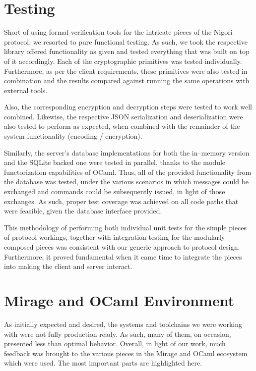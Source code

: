 \section{Testing}
Short of using formal verification tools for the intricate pieces of the Nigori protocol, we resorted to pure functional testing.
As such, we took the respective library offered functionality as given and tested everything that was built on top of it accordingly.
Each of the cryptographic primitives was tested individually.
Furthermore, as per the client requirements, these primitives were also tested in combination and the results compared against running the same operations with external tools.

Also, the corresponding encryption and decryption steps were tested to work well combined.
Likewise, the respective JSON serialization and deserialization were also tested to perform as expected, when combined with the remainder of the system functionality (encoding / encryption).

Similarly, the server's database implementations for both the in--memory version and the SQLite backed one were tested in parallel, thanks to the module functorization capabilities of OCaml.
Thus, all of the provided functionality from the database was tested, under the various scenarios in which messages could be exchanged and commands could be subsequently issued, in light of those exchanges.
As such, proper test coverage was achieved on all code paths that were feasible, given the database interface provided.

This methodology of performing both individual unit tests for the simple pieces of protocol workings, together with integration testing for the modularly composed pieces was consistent with our generic approach to protocol design.
Furthermore, it proved fundamental when it came time to integrate the pieces into making the client and server interact.

\section{Mirage and OCaml Environment}
As initially expected and desired, the systems and toolchains we were working with were not fully production ready.
As such, many of them, on occasion, presented less than optimal behavior.
Overall, in light of our work, much feedback was brought to the various pieces in the Mirage and OCaml ecosystem which were used.
The most important parts are highlighted here.

